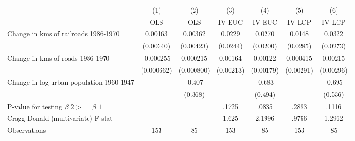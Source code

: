 {
\def\sym#1{\ifmmode^{#1}\else\(^{#1}\)\fi}
\begin{tabular}{l*{6}{c}}
\hline\hline
                &\multicolumn{1}{c}{(1)}&\multicolumn{1}{c}{(2)}&\multicolumn{1}{c}{(3)}&\multicolumn{1}{c}{(4)}&\multicolumn{1}{c}{(5)}&\multicolumn{1}{c}{(6)}\\
                &\multicolumn{1}{c}{OLS}&\multicolumn{1}{c}{OLS}&\multicolumn{1}{c}{IV EUC}&\multicolumn{1}{c}{IV EUC}&\multicolumn{1}{c}{IV LCP}&\multicolumn{1}{c}{IV LCP}\\
\hline
Change in kms of railroads 1986-1970&  0.00163         &  0.00362         &   0.0229         &   0.0270         &   0.0148         &   0.0322         \\
                &(0.00340)         &(0.00423)         & (0.0244)         & (0.0200)         & (0.0285)         & (0.0273)         \\
[1em]
Change in kms of roads 1986-1970&-0.000255         & 0.000215         &  0.00164         &  0.00122         & 0.000415         &  0.00215         \\
                &(0.000662)         &(0.000800)         &(0.00213)         &(0.00179)         &(0.00291)         &(0.00296)         \\
[1em]
Change in log urban population 1960-1947&                  &   -0.407         &                  &   -0.683         &                  &   -0.695         \\
                &                  &  (0.368)         &                  &  (0.494)         &                  &  (0.536)         \\
\hline
P-value for testing $\beta\_{2} >= \beta\_{1}$&                  &                  &    .1725         &    .0835         &    .2883         &    .1116         \\
Cragg-Donald (multivariate) F-stat&                  &                  &    1.625         &   2.1996         &    .9766         &   1.2962         \\
Observations    &      153         &       85         &      153         &       85         &      153         &       85         \\
\hline\hline
\end{tabular}
}
